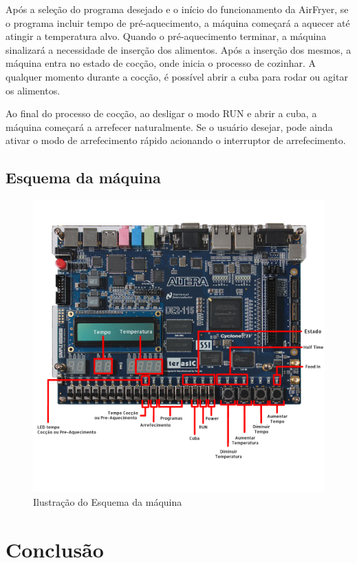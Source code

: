 \documentclass[a4paper, 11pt, onecolumn, oneside]{report}
\begin{document}
Após a seleção do programa desejado e o início do funcionamento da AirFryer, se o programa incluir tempo de pré-aquecimento, a máquina começará a aquecer até atingir a temperatura alvo. Quando o pré-aquecimento terminar, a máquina sinalizará a necessidade de inserção dos alimentos. Após a inserção dos mesmos, a máquina entra no estado de cocção, onde inicia o processo de cozinhar. A qualquer momento durante a cocção, é possível abrir a cuba para rodar ou agitar os alimentos.
\par
Ao final do processo de cocção, ao desligar o modo RUN e abrir a cuba, a máquina começará a arrefecer naturalmente. Se o usuário desejar, pode ainda ativar o modo de arrefecimento rápido acionando o interruptor de arrefecimento.

\section{Esquema da máquina}
\begin{figure}[H]
    \centering
    \includegraphics[width=\textwidth]{images/FPGA_Ilustrada.jpg}
    \caption{Ilustração do Esquema da máquina}
    \label{fig:fpga}
\end{figure}


\chapter{Conclusão}
\end{document}
